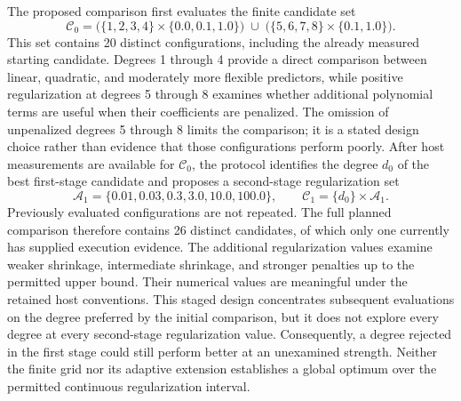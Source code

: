 \documentclass[11pt]{article}
\begin{document}
The proposed comparison first evaluates the finite candidate set
\[
\mathcal{C}_0
=
\bigl(\{1,2,3,4\}\times\{0.0,0.1,1.0\}\bigr)
\;\cup\;
\bigl(\{5,6,7,8\}\times\{0.1,1.0\}\bigr).
\]
This set contains 20 distinct configurations, including the already measured starting candidate. Degrees 1 through 4 provide a direct comparison between linear, quadratic, and moderately more flexible predictors, while positive regularization at degrees 5 through 8 examines whether additional polynomial terms are useful when their coefficients are penalized. The omission of unpenalized degrees 5 through 8 limits the comparison; it is a stated design choice rather than evidence that those configurations perform poorly. After host measurements are available for \(\mathcal{C}_0\), the protocol identifies the degree \(d_0\) of the best first-stage candidate and proposes a second-stage regularization set
\[
\mathcal{A}_1=\{0.01,0.03,0.3,3.0,10.0,100.0\},
\qquad
\mathcal{C}_1=\{d_0\}\times\mathcal{A}_1.
\]
Previously evaluated configurations are not repeated. The full planned comparison therefore contains 26 distinct candidates, of which only one currently has supplied execution evidence. The additional regularization values examine weaker shrinkage, intermediate shrinkage, and stronger penalties up to the permitted upper bound. Their numerical values are meaningful under the retained host conventions. This staged design concentrates subsequent evaluations on the degree preferred by the initial comparison, but it does not explore every degree at every second-stage regularization value. Consequently, a degree rejected in the first stage could still perform better at an unexamined strength. Neither the finite grid nor its adaptive extension establishes a global optimum over the permitted continuous regularization interval.
\end{document}
